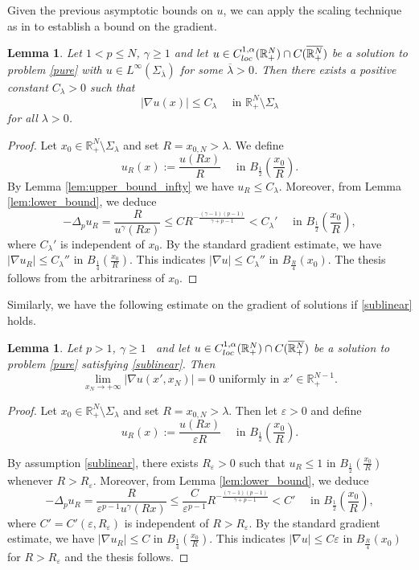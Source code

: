 \documentclass[reqno]{amsart}
\theoremstyle{plain}
\newtheorem{lemma}[theorem]{Lemma}
\theoremstyle{definition}
\theoremstyle{remark}
\begin{document}
	Given the previous asymptotic bounds on \( u \), we can apply the scaling technique as in \cite[Proposition 7]{MR4753083} to establish a bound on the gradient.
	\begin{lemma}
		Let $1<p\le N$, $\gamma\ge1$ and let $u \in C^{1,\alpha}_{\rm loc}(\mathbb{R}^N_+) \cap C(\overline{\mathbb{R}^N_+})$ be a solution to problem \eqref{pure} with $u\in L^\infty(\Sigma_{\overline\lambda})$ for some $\overline\lambda>0$. Then there exists a positive constant $C_\lambda > 0$ such that
		\[
		|\nabla u(x)| \le C_\lambda \quad\text{ in } \mathbb{R}^N_+\setminus\Sigma_\lambda
		\]
		for all $\lambda>0$.
	\end{lemma}
	\begin{proof}
		Let $x_0\in\mathbb{R}^N_+\setminus\Sigma_\lambda$ and set $R=x_{0,N}>\lambda$. We define
		\[
		u_R(x) := \frac{u(Rx)}{R} \quad\text{ in } B_{\frac{1}{2}}\left(\frac{x_0}{R}\right).
		\]
		By Lemma \ref{lem:upper_bound_infty} we have $u_R \le C_\lambda$. Moreover, from Lemma \ref{lem:lower_bound}, we deduce
		\[
		-\Delta_p u_R = \frac{R}{u^\gamma(Rx)} \le CR^{-\frac{(\gamma-1)(p-1)}{\gamma+p-1}} < C_\lambda' \quad\text{ in } B_{\frac{1}{2}}\left(\frac{x_0}{R}\right),
		\]
		where $C_\lambda'$ is independent of $x_0$.		
		By the standard gradient estimate, we have $|\nabla u_R| \le C_\lambda''$ in $B_{\frac{1}{4}}\left(\frac{x_0}{R}\right)$. This indicates $|\nabla u| \le C_\lambda''$ in $B_{\frac{R}{4}}(x_0)$. The thesis follows from the arbitrariness of $x_0$.
	\end{proof}
	
	Similarly, we have the following estimate on the gradient of solutions if \eqref{sublinear} holds.
	\begin{lemma}\label{lem:upper_bound_gradient2}
		Let $p>1$, $\gamma\ge1$  and let $u \in C^{1,\alpha}_{\rm loc}(\mathbb{R}^N_+) \cap C(\overline{\mathbb{R}^N_+})$ be a solution to problem \eqref{pure} satisfying \eqref{sublinear}. Then
		\[
		\lim_{x_N\to+\infty} |\nabla u(x',x_N)|=0 \text{ uniformly in } x'\in\mathbb{R}^{N-1}_+.
		\]
	\end{lemma}
	\begin{proof}
		Let $x_0\in\mathbb{R}^N_+\setminus\Sigma_\lambda$ and set $R=x_{0,N}>\lambda$. Then let $\varepsilon>0$ and define
		\[
		u_R(x) := \frac{u(Rx)}{\varepsilon R} \quad\text{ in } B_{\frac{1}{2}}\left(\frac{x_0}{R}\right).
		\]
		
		By assumption \eqref{sublinear}, there exists $R_\varepsilon>0$ such that $u_R \le 1$ in $B_{\frac{1}{2}}\left(\frac{x_0}{R}\right)$ whenever $R>R_\varepsilon$. Moreover, from Lemma \ref{lem:lower_bound}, we deduce
		\[
		-\Delta_p u_R = \frac{R}{\varepsilon^{p-1} u^\gamma(Rx)} \le \frac{C}{\varepsilon^{p-1}}R^{-\frac{(\gamma-1)(p-1)}{\gamma+p-1}} < C' \quad\text{ in } B_{\frac{1}{2}}\left(\frac{x_0}{R}\right),
		\]
		where $C'=C'(\varepsilon,R_\varepsilon)$ is independent of $R>R_\varepsilon$.		
		By the standard gradient estimate, we have $|\nabla u_R| \le C$ in $B_{\frac{1}{4}}\left(\frac{x_0}{R}\right)$. This indicates $|\nabla u| \le C\varepsilon$ in $B_{\frac{R}{4}}(x_0)$ for $R>R_\varepsilon$ and the thesis follows.
	\end{proof}
	
\end{document}
